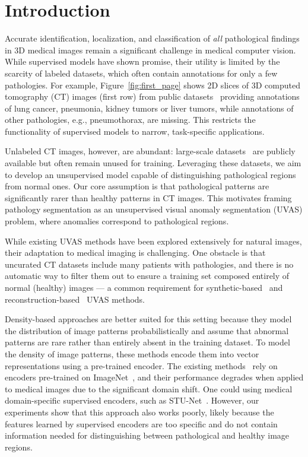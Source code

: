 
\section{Introduction}
\label{sec:intro}



Accurate identification, localization, and classification of \emph{all} pathological findings in 3D medical images remain a significant challenge in medical computer vision. While supervised models have shown promise, their utility is limited by the scarcity of labeled datasets, which often contain annotations for only a few pathologies. For example, Figure~\ref{fig:first_page} shows 2D slices of 3D computed tomography (CT) images (first row) from public datasets~\cite{lidc,midrc,kits,lits} providing annotations of lung cancer, pneumonia, kidney tumors or liver tumors, while annotations of other pathologies, e.g., pneumothorax, are missing. This restricts the functionality of supervised models to narrow, task-specific applications.

Unlabeled CT images, however, are abundant: large-scale datasets~\cite{nlst,amos,abdomen_atlas} are publicly available but often remain unused for training. Leveraging these datasets, we aim to develop an unsupervised model capable of distinguishing pathological regions from normal ones. Our core assumption is that pathological patterns are significantly rarer than healthy patterns in CT images. This motivates framing pathology segmentation as an unsupervised visual anomaly segmentation (UVAS) problem, where anomalies correspond to pathological regions.

While existing UVAS methods have been explored extensively for natural images, their adaptation to medical imaging is challenging. One obstacle is that uncurated CT datasets include many patients with pathologies, and there is no automatic way to filter them out to ensure a training set composed entirely of normal (healthy) images --- a common requirement for synthetic-based~\cite{draem,mood_top1} and reconstruction-based~\cite{autoencoder,fanogan} UVAS methods.

Density-based approaches are better suited for this setting because they model the distribution of image patterns probabilistically and assume that abnormal patterns are rare rather than entirely absent in the training dataset. To model the density of image patterns, these methods encode them into vector representations using a pre-trained encoder. The existing methods~\cite{cflow,msflow} rely on encoders pre-trained on ImageNet~\cite{imagenet}, and their performance degrades when applied to medical images due to the significant domain shift. One could using medical domain-specific supervised encoders, such as STU-Net~\cite{stu_net}. However, our experiments show that this approach also works poorly, likely because the features learned by supervised encoders are too specific and do not contain information needed for distinguishing between pathological and healthy image regions.

